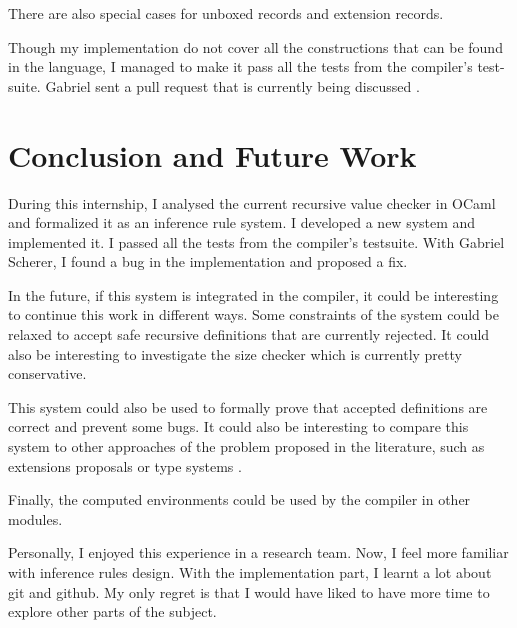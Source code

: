 \documentclass{article}
\begin{document}
There are also special cases for unboxed records and extension records.

Though my implementation do not cover all the constructions that can be found in
the language, I managed to make it pass all the tests from the compiler's
test-suite. Gabriel sent a pull request that is currently being discussed
\cite{NewSystemPullRequest}.

\section*{Conclusion and Future Work}
During this internship, I analysed the current recursive value checker in OCaml
and formalized it as an inference rule system. I developed a new system and
implemented it. I passed all the tests from the compiler's testsuite. With
Gabriel Scherer, I found a bug in the implementation and proposed a fix.

In the future, if this system is integrated in the compiler, it could be
interesting to continue this work in different ways. Some constraints of the
system could be relaxed to accept safe recursive definitions that are currently
rejected. It could also be interesting to investigate the size checker which is
currently pretty conservative.

This system could also be used to formally prove that accepted definitions are
correct and prevent some bugs. It could also be interesting to compare this
system to other approaches of the problem proposed in the literature, such as
extensions proposals \cite{jeannin2012cocaml} or type systems
\cite{dreyer2004type}.

Finally, the computed environments could be used by the compiler in other
modules.

Personally, I enjoyed this experience in a research team. Now, I feel more
familiar with inference rules design. With the implementation part, I learnt a
lot about git and github. My only regret is that I would have liked to have
more time to explore other parts of the subject.



\end{document}
